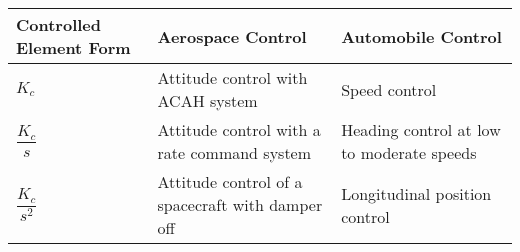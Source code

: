 \begin{tabular}{L{.2\linewidth} *{2}{L{.3\linewidth}}}
    \toprule
    Controlled Element Form & Aerospace Control                                & Automobile Control                        \\
    \midrule
    $K_c$                   & Attitude control with ACAH system                & Speed control                             \\
    $\dfrac{K_c}{s}$        & Attitude control with a rate command system      & Heading control at low to moderate speeds \\
    $\dfrac{K_c}{s^2}$      & Attitude control of a spacecraft with damper off & Longitudinal position control             \\
    \bottomrule
\end{tabular}
